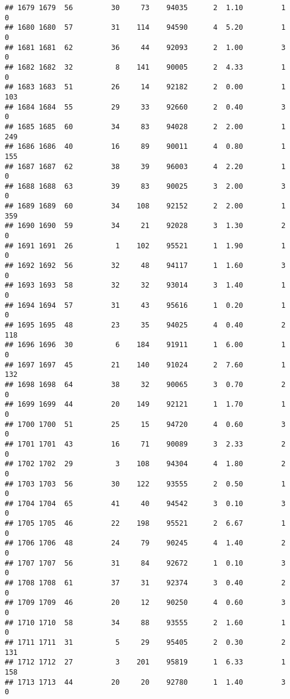 \documentclass[
]{article}
\begin{document}
\begin{verbatim}
## 1679 1679  56         30     73    94035      2  1.10         1        0
## 1680 1680  57         31    114    94590      4  5.20         1        0
## 1681 1681  62         36     44    92093      2  1.00         3        0
## 1682 1682  32          8    141    90005      2  4.33         1        0
## 1683 1683  51         26     14    92182      2  0.00         1      103
## 1684 1684  55         29     33    92660      2  0.40         3        0
## 1685 1685  60         34     83    94028      2  2.00         1      249
## 1686 1686  40         16     89    90011      4  0.80         1      155
## 1687 1687  62         38     39    96003      4  2.20         1        0
## 1688 1688  63         39     83    90025      3  2.00         3        0
## 1689 1689  60         34    108    92152      2  2.00         1      359
## 1690 1690  59         34     21    92028      3  1.30         2        0
## 1691 1691  26          1    102    95521      1  1.90         1        0
## 1692 1692  56         32     48    94117      1  1.60         3        0
## 1693 1693  58         32     32    93014      3  1.40         1        0
## 1694 1694  57         31     43    95616      1  0.20         1        0
## 1695 1695  48         23     35    94025      4  0.40         2      118
## 1696 1696  30          6    184    91911      1  6.00         1        0
## 1697 1697  45         21    140    91024      2  7.60         1      132
## 1698 1698  64         38     32    90065      3  0.70         2        0
## 1699 1699  44         20    149    92121      1  1.70         1        0
## 1700 1700  51         25     15    94720      4  0.60         3        0
## 1701 1701  43         16     71    90089      3  2.33         2        0
## 1702 1702  29          3    108    94304      4  1.80         2        0
## 1703 1703  56         30    122    93555      2  0.50         1        0
## 1704 1704  65         41     40    94542      3  0.10         3        0
## 1705 1705  46         22    198    95521      2  6.67         1        0
## 1706 1706  48         24     79    90245      4  1.40         2        0
## 1707 1707  56         31     84    92672      1  0.10         3        0
## 1708 1708  61         37     31    92374      3  0.40         2        0
## 1709 1709  46         20     12    90250      4  0.60         3        0
## 1710 1710  58         34     88    93555      2  1.60         1        0
## 1711 1711  31          5     29    95405      2  0.30         2      131
## 1712 1712  27          3    201    95819      1  6.33         1      158
## 1713 1713  44         20     20    92780      1  1.40         3        0

\end{verbatim}
\end{document}
